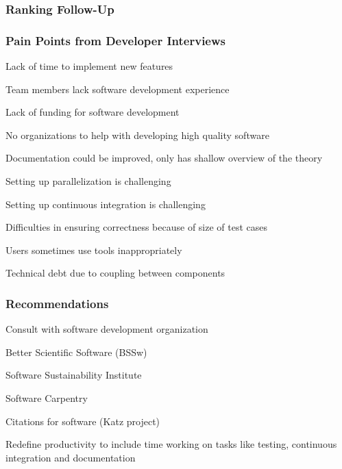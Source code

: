 \documentclass[t,12pt,numbers,fleqn]{beamer}
\begin{document}
\begin{frame}
\frametitle{Ranking Follow-Up}

\bi
\item {}
\item {}
\item {}
\ei

\end{frame}


\begin{frame}
\frametitle{Pain Points from Developer Interviews}

\bi
\item Lack of time to implement new features
\item Team members lack software development experience
\item Lack of funding for software development
\item No organizations to help with developing high quality software
\item Documentation could be improved, only has shallow overview of the theory
\item Setting up parallelization is challenging
\item Setting up continuous integration is challenging
\item Difficulties in ensuring correctness because of size of test cases
\item Users sometimes use tools inappropriately
\item Technical debt due to coupling between components
  \ei

\end{frame}


\begin{frame}
\frametitle{Recommendations}

\bi
\item Consult with software development organization
  \bi
\item Better Scientific Software (BSSw)
\item Software Sustainability Institute
\item Software Carpentry
  \ei
\item Citations for software (Katz project)
  \item Redefine productivity to include time working on tasks like testing, continuous
    integration and documentation
\ei

\end{frame}
\end{document}
